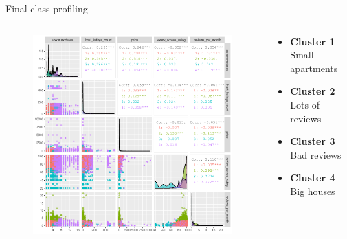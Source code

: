 \begin{frame}{Final class profiling}
\begin{columns}
\begin{column}{0.5\textwidth}

\begin{figure}[H]
\centering
\includegraphics[width=\textwidth]{pairs.png}
\end{figure}
\end{column}
\begin{column}{0.5\textwidth}
    \begin{itemize}
        \item \textcolor{vermell}{\textbf{Cluster 1}} Small apartments
        \item \textcolor{verd}{\textbf{Cluster 2}} Lots of reviews
        \item \textcolor{blau}{\textbf{Cluster 3}} Bad reviews
        \item \textcolor{lila}{\textbf{Cluster 4}} Big houses
    \end{itemize}

    \begin{table}[H]
        \centering
        
    \end{table}
\end{column}
\end{columns}
\end{frame}

